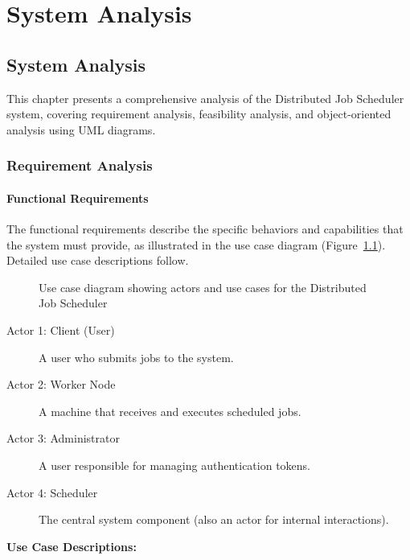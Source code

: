 \chapter{System Analysis}

\section{System Analysis}

This chapter presents a comprehensive analysis of the Distributed Job Scheduler system, covering requirement analysis, feasibility analysis, and object-oriented analysis using UML diagrams.

\subsection{Requirement Analysis}

\subsubsection{Functional Requirements}

The functional requirements describe the specific behaviors and capabilities that the system must provide, as illustrated in the use case diagram (Figure~\ref{fig:use-case}). Detailed use case descriptions follow.

\begin{figure}[htbp]
	\centering
	\caption{Use case diagram showing actors and use cases for the Distributed Job Scheduler}
	\label{fig:use-case}
\end{figure}

\begin{description}
	\item[Actor 1: Client (User)] A user who submits jobs to the system.
	\item[Actor 2: Worker Node] A machine that receives and executes scheduled jobs.
	\item[Actor 3: Administrator] A user responsible for managing authentication tokens.
	\item[Actor 4: Scheduler] The central system component (also an actor for internal interactions).
\end{description}

\textbf{Use Case Descriptions:}

